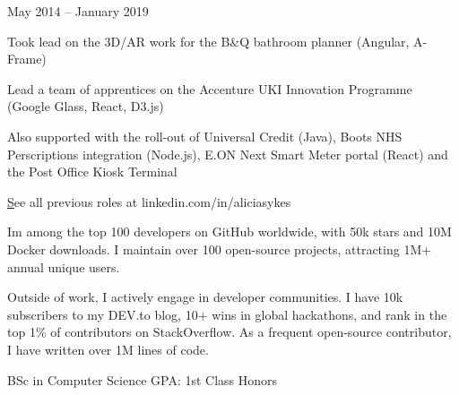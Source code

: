 \documentclass[]{awesome-cv}
\begin{document}
\begin{cventries}
    {}
    { May 2014 – January 2019 }
    {\begin{cvitems}
        \item { Took lead on the 3D/AR work for the B\&Q bathroom planner (Angular, A-Frame) }
        \item { Lead a team of apprentices on the Accenture UKI Innovation Programme (Google Glass, React, D3.js) }
        \item { Also supported with the roll-out of Universal Credit (Java), Boots NHS Perscriptions integration (Node.js), E.ON Next Smart Meter portal (React) and the Post Office Kiosk Terminal }
    \end{cvitems}}
\end{cventries}

    \begin{flushright}
        \small\color{lightgray} \href{ https://linkedin.com/in/aliciasykes }See all previous roles at linkedin.com/in/aliciasykes
    \end{flushright}




\begin{cvachievements}
    \item { I\textquotesingle{}m among the top 100 developers on GitHub worldwide, with 50k stars and 10M Docker downloads. I maintain over 100 open-source projects, attracting 1M+ annual unique users. }
    \item { Outside of work, I actively engage in developer communities. I have 10k subscribers to my DEV.to blog, 10+ wins in global hackathons, and rank in the top 1\% of contributors on StackOverflow. As a frequent open-source contributor, I have written over 1M lines of code. }
\end{cvachievements}



\begin{cventries}
    \cventry
    { BSc in Computer Science }
    {  }
    {}
    {}
    {GPA: 1st Class Honors}
\end{cventries}


\vspace{-2mm}
\end{document}
